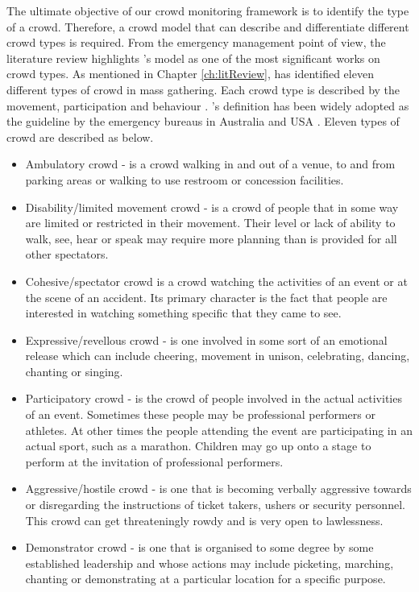 The ultimate objective of our crowd monitoring framework is to identify the type of a crowd. Therefore, a crowd model that can describe and differentiate different crowd types is required. From the emergency management point of view, the literature review highlights \citet{Berlonghi1995}'s model as one of the most significant works on crowd types. As mentioned in Chapter \ref{ch:litReview}, \citet{Berlonghi1995} has identified eleven different types of crowd in mass gathering. Each crowd type is described by the movement, participation and behaviour \citep{Zeitz2009}. \citet{Berlonghi1995}'s definition has been widely adopted as the guideline by the emergency bureaus in Australia \citep{EMA1999} and USA \citep{FEMA2005}. Eleven types of crowd are described as below.
\begin{itemize}
\item Ambulatory crowd - is a crowd walking in and out of a venue, to and from parking areas or walking to use restroom or concession facilities.
\item Disability/limited movement crowd - is a crowd of people that in some way are limited or restricted in their movement. Their level or lack of ability to walk, see, hear or speak may require more planning than is provided for all other spectators.
\item Cohesive/spectator crowd is a crowd watching the activities of an event or at the scene of an accident. Its primary character is the fact that people are interested in watching something specific that they came to see.
\item Expressive/revellous crowd - is one involved in some sort of an emotional release which can include cheering, movement in unison, celebrating, dancing, chanting or singing.
\item Participatory crowd - is the crowd of people involved in the actual activities of an event. Sometimes these people may be professional performers or athletes. At other times the people attending the event are participating in an actual sport, such as a marathon. Children may go up onto a stage to perform at the invitation of professional performers.
\item Aggressive/hostile crowd - is one that is becoming verbally aggressive towards or disregarding the instructions of ticket takers, ushers or security personnel. This crowd can get threateningly rowdy and is very open to lawlessness.
\item Demonstrator crowd - is one that is organised to some degree by some established leadership and whose actions may include picketing, marching, chanting or demonstrating at a particular location for a specific purpose.

\end{itemize}
